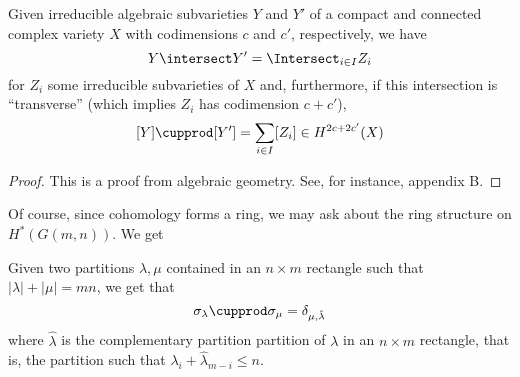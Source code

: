 \documentclass[11pt,leqno,oneside]{amsart}
\numberwithin{thm}{section}
\begin{document}
\begin{lem}
  Given  irreducible algebraic subvarieties \(Y\) and
  \(Y'\) of a compact and connected complex variety \(X\) with
  codimensions \(c\) and \(c'\), respectively, we have \[
    Y \intersect Y' = \Intersect_{i \in I} Z_i
  \]
  for \(Z_i\) some irreducible subvarieties of \(X\) and, furthermore, 
  if this intersection is ``transverse'' (which implies \(Z_i\) has
  codimension \(c+c'\)), \[ 
    [Y] \cupprod [Y'] = \sum_{i \in I} [Z_i] \in H^{2c+2c'}(X)
  \]
\end{lem}
\begin{proof}
  This is a proof from algebraic geometry. See, for instance,
  \cite{fulton} appendix B. 
\end{proof}
Of course, since cohomology forms a
ring, we may ask about the ring 
structure on \(H^*(G(m,n))\). We get
\begin{prop}
  Given two partitions \(\lambda,\mu\) contained in an \(n \times m\)
  rectangle such that \(|\lambda|+|\mu|=mn\), we get that \[
    \sigma_\lambda \cupprod \sigma_\mu = \delta_{\mu,\hat{\lambda}}
  \]
  where \(\hat{\lambda}\) is the complementary partition partition of
  \(\lambda\) in an \(n \times m\) rectangle, that is, the partition
  such that \(\lambda_i+\hat{\lambda}_{m-i} \leq n\). 
\end{prop}
\end{document}

